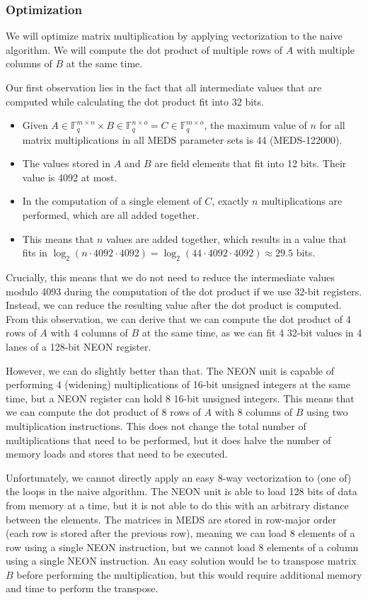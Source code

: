 \documentclass[11pt,a4paper]{report}
\theoremstyle{definition}
\begin{document}
\subsubsection{Optimization}
\label{sec:matrixmultiplicationoptimization}
We will optimize matrix multiplication by applying vectorization to the naive algorithm. We will compute the dot product of multiple rows of $A$ with multiple columns of $B$ at the same time.

Our first observation lies in the fact that all intermediate values that are computed while calculating the dot product fit into 32 bits.
\begin{itemize}
  \item Given $A \in \mathbb{F}_q^{m \times n} \times B \in \mathbb{F}_q^{n \times o} = C \in \mathbb{F}_q^{m \times o}$, the maximum value of $n$ for all matrix multiplications in all MEDS parameter sets is 44 (MEDS-122000).
  \item The values stored in $A$ and $B$ are field elements that fit into 12 bits. Their value is 4092 at most.
  \item In the computation of a single element of $C$, exactly $n$ multiplications are performed, which are all added together.
  \item This means that $n$ values are added together, which results in a value that fits in $\log_2(n \cdot 4092 \cdot 4092) = \log_2(44 \cdot 4092 \cdot 4092) \approx 29.5$ bits.
\end{itemize}
Crucially, this means that we do not need to reduce the intermediate values modulo 4093 during the computation of the dot product if we use 32-bit registers. Instead, we can reduce the resulting value after the dot product is computed. From this observation, we can derive that we can compute the dot product of 4 rows of $A$ with 4 columns of $B$ at the same time, as we can fit 4 32-bit values in 4 lanes of a 128-bit NEON register.

However, we can do slightly better than that. The NEON unit is capable of performing 4 (widening) multiplications of 16-bit unsigned integers at the same time, but a NEON register can hold 8 16-bit unsigned integers. This means that we can compute the dot product of 8 rows of $A$ with 8 columns of $B$ using two multiplication instructions. This does not change the total number of multiplications that need to be performed, but it does halve the number of memory loads and stores that need to be executed.

Unfortunately, we cannot directly apply an easy 8-way vectorization to (one of) the loops in the naive algorithm. The NEON unit is able to load 128 bits of data from memory at a time, but it is not able to do this with an arbitrary distance between the elements. The matrices in MEDS are stored in row-major order (each row is stored after the previous row), meaning we can load 8 elements of a row using a single NEON instruction, but we cannot load 8 elements of a column using a single NEON instruction. An easy solution would be to transpose matrix $B$ before performing the multiplication, but this would require additional memory and time to perform the transpose. 
\end{document}
